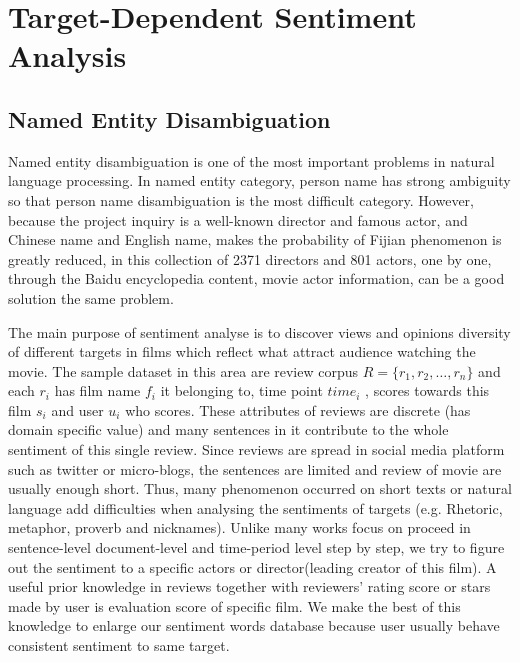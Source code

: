 \section{Target-Dependent Sentiment Analysis}
\label{sec:sent}
\subsection{Named Entity Disambiguation}
Named entity disambiguation is one of the most important problems in natural language processing. In named entity category, person name has strong ambiguity so that person name disambiguation is the most difficult category. However, because the project inquiry is a well-known director and famous actor, and Chinese name and English name, makes the probability of Fijian phenomenon is greatly reduced, in this collection of 2371 directors and 801 actors, one by one, through the Baidu encyclopedia content, movie actor information, can be a good solution the same problem.
\par The main purpose of sentiment analyse is to discover views and opinions diversity \cite{katiyar2016investigating} of different targets in films which reflect what attract audience watching the movie. The sample dataset in this area are review corpus $ R =\{r_1, r_2, \dots, r_n\}$ and each $r_i$ has film name  $f_i$ it belonging to, time point $time_i$ , scores towards this film $s_i$ and user $u_i$ who scores. These attributes of reviews are discrete (has domain specific value) and many sentences in it contribute to the whole sentiment of this single review. Since reviews are spread in social media platform such as twitter or micro-blogs, the sentences are limited and review of movie are usually enough short. Thus, many phenomenon occurred on short texts or natural language add difficulties when analysing the sentiments of targets (e.g. Rhetoric, metaphor, proverb and nicknames)\cite{li2014sentiment}. Unlike many works focus on proceed in sentence-level document-level and time-period level step by step\cite{chen2017improving}, we try to figure out the sentiment to a specific actors or director(leading creator of this film)\cite{dong2014adaptive}. A useful prior knowledge in reviews together with reviewers' rating score or stars made by user is evaluation score of specific film. We make the best of this knowledge to enlarge our sentiment words database because user usually behave consistent sentiment to same target.

